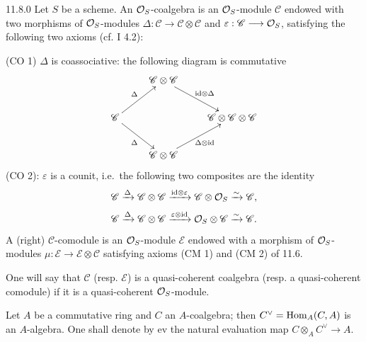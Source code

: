 \begin{definition}{11.8.0}\label{VIB.11.8.0}
Let $S$ be a scheme. An $\mathcal{O}_S$-coalgebra is an $\mathcal{O}_S$-module $\mathscr C$ endowed with two morphisms of $\mathcal{O}_S$-modules $\Delta:\mathscr C\to\mathscr C\otimes\mathscr C$ and $\varepsilon:\mathscr C\longrightarrow\mathcal{O}_S$, satisfying the following two axioms (cf. I 4.2):

(CO 1) $\Delta$ is coassociative: the following diagram is commutative
\[
\xymatrix{&\mathscr C\otimes\mathscr C\ar[dr]^{\mathrm{id}\otimes\Delta}&\\\mathscr C\ar[ur]^\Delta\ar[dr]_\Delta&&\mathscr C\otimes\mathscr C\otimes\mathscr C\\&\mathscr C\otimes\mathscr C\ar[ur]_{\Delta\otimes\mathrm{id}}&}
\]
(CO 2): $\varepsilon$ is a counit, i.e.\ the following two composites are the identity
\[
\mathscr C\xrightarrow{\Delta}\mathscr C\otimes\mathscr C\xrightarrow{\mathrm{id}\otimes\varepsilon}\mathscr C\otimes\mathcal{O}_S\xrightarrow{\sim}\mathscr C,
\]
\[
\mathscr C\xrightarrow{\Delta}\mathscr C\otimes\mathscr C\xrightarrow{\varepsilon\otimes\mathrm{id}}\mathcal{O}_S\otimes\mathscr C\xrightarrow{\sim}\mathscr C.
\]
A (right) $\mathscr C$-comodule is an $\mathcal{O}_S$-module $\mathscr E$ endowed with a morphism of $\mathcal{O}_S$-modules $\mu:\mathscr E\to\mathscr E\otimes\mathscr C$ satisfying axioms (CM 1) and (CM 2) of 11.6.

One will say that $\mathscr C$ (resp. $\mathscr E$) is a quasi-coherent coalgebra (resp. a quasi-coherent comodule) if it is a quasi-coherent $\mathcal{O}_S$-module.
\end{definition}
Let $A$ be a commutative ring and $C$ an $A$-coalgebra; then $C^\vee=\operatorname{Hom}_A(C,A)$ is an $A$-algebra. One shall denote by $\mathrm{ev}$ the natural evaluation map $C\otimes_A C^\vee\to A$.

